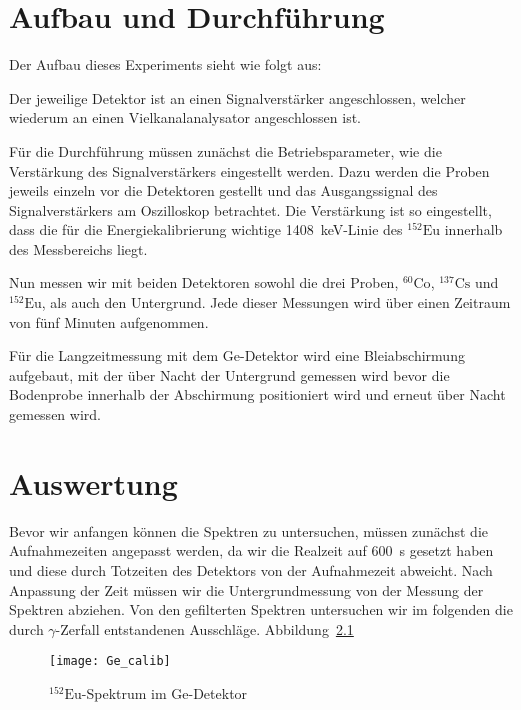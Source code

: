 \documentclass[11pt, ngerman, fleqn, DIV=15, headinclude, BCOR=2cm]{scrreprt}
\newcommand{\plotwidth}{0.8\linewidth}
\begin{document}
\chapter{Aufbau und Durchführung}

Der Aufbau dieses Experiments sieht wie folgt aus:

Der jeweilige Detektor ist an einen Signalverstärker angeschlossen, welcher
wiederum an einen Vielkanalanalysator angeschlossen ist.

Für die Durchführung müssen zunächst die Betriebsparameter, wie die
Verstärkung des Signalverstärkers eingestellt werden.
Dazu werden die Proben jeweils einzeln vor die Detektoren gestellt und das
Ausgangssignal des Signalverstärkers am Oszilloskop betrachtet.
Die Verstärkung ist so eingestellt, dass die für die Energiekalibrierung
wichtige \SI{1408}{\kilo\electronvolt}-Linie des $^{152}\text{Eu}$
innerhalb des Messbereichs liegt.

Nun messen wir mit beiden Detektoren sowohl die drei Proben, $^{60}\text{Co}$,
$^{137}\text{Cs}$ und $^{152}\text{Eu}$, als auch den Untergrund. Jede dieser
Messungen wird über einen Zeitraum von fünf Minuten aufgenommen.

Für die Langzeitmessung mit dem Ge-Detektor wird eine Bleiabschirmung
aufgebaut, mit der über Nacht der Untergrund gemessen wird bevor die Bodenprobe
innerhalb der Abschirmung positioniert wird und erneut über Nacht gemessen wird.

\chapter{Auswertung}

Bevor wir anfangen können die Spektren zu untersuchen, müssen zunächst die
Aufnahmezeiten angepasst werden, da wir die Realzeit auf \SI{600}{\second} gesetzt
haben und diese durch Totzeiten des Detektors von der Aufnahmezeit abweicht.
Nach Anpassung der Zeit müssen wir die
Untergrundmessung von der Messung der Spektren abziehen.
Von den gefilterten Spektren untersuchen wir im folgenden die durch
$\gamma$-Zerfall entstandenen Ausschläge. Abbildung~\ref{fig:energiekalibrierung}

\begin{figure}
    \centering
    \texttt{[image: Ge\_calib]}
    \caption{%
	    $^{152}\text{Eu}$-Spektrum im Ge-Detektor
    }
    \label{fig:energiekalibrierung}
\end{figure}
\end{document}
